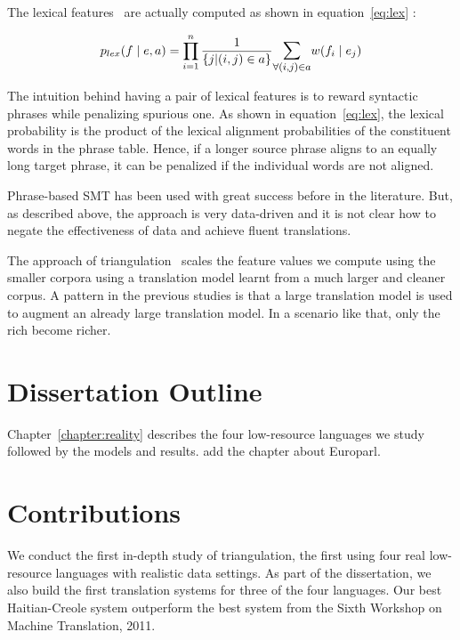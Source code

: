  The lexical features~\cite{Koehn:03} are actually computed as shown in equation~\eqref{eq:lex} : 

\begin{equation} \label{eq:lex}
	p_{lex}(f \mid e, a) = \prod\limits_{i=1}^{n} \frac{1}{\{j | (i,j) \in a\}}
	\mathlarger{\sum\limits_{\forall (i,j) \in a}} w(f_{i} \mid e_{j})
\end{equation}


The intuition behind having a pair of lexical features is to reward syntactic phrases while penalizing spurious one. As shown in equation~\eqref{eq:lex}, the lexical probability is the product of the lexical alignment probabilities of the constituent words in the phrase table. Hence, if a longer source phrase aligns to an equally long target phrase, it can be penalized if the individual words are not aligned. 

Phrase-based SMT has been used with great success before in the literature. But, as described above, the approach is very data-driven and it is not clear how to negate the effectiveness of data and achieve fluent translations. 

The approach of triangulation~\cite{Cohn:07,Utiyama:07,Nakov:12} scales the feature values we compute using the smaller corpora using a translation model learnt from a much larger and cleaner corpus. A pattern in the previous studies is that a large translation model is used to augment an already large translation model. In a scenario like that, only the rich become richer.  

\section{Dissertation Outline}
\label{sec:outline}
Chapter~\ref{chapter:reality} describes the four low-resource languages we study followed by the models and results. \alert{add the chapter about Europarl}.

\section{Contributions}
\label{sec:summary}
We conduct the first in-depth study of triangulation, the first using four real low-resource languages with realistic data settings. As part of the dissertation, we also build the first translation systems for three of the four languages. Our best Haitian-Creole system outperform the best system from the Sixth Workshop on Machine Translation, 2011. 



